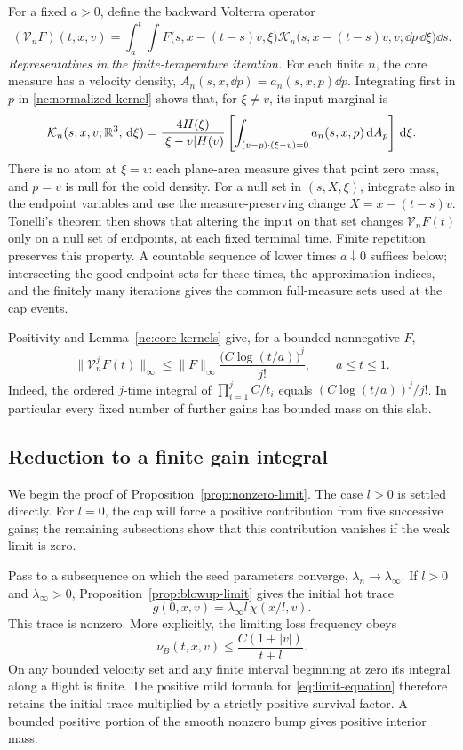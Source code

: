 For a fixed \(a>0\), define the backward Volterra operator
\begin{equation}
\label{nc:volterra}
 (\mathcal V_n F)(t,x,v)
 =
 \int_a^t\int
 F\bigl(s,x-(t-s)v,\xi\bigr)
 \mathcal K_n\bigl(s,x-(t-s)v,v;\dd p\,\dd\xi\bigr)\dd s .
\end{equation}
\emph{Representatives in the finite-temperature iteration.}
For each finite \(n\), the core measure has a velocity density,
\(A_n(s,x,\dd p)=a_n(s,x,p)\dd p\).
Integrating first in \(p\) in \eqref{nc:normalized-kernel} shows that,
for \(\xi\ne v\), its input marginal is
\[
\mathcal K_n(s,x,v;\mathbb R^3,\,\mathrm d\xi)
=\frac{4H(\xi)}{|\xi-v|H(v)}
  \left[\int_{(v-p)\cdot(\xi-v)=0}
       a_n(s,x,p)\,\mathrm d A_p\right]\,\mathrm d\xi.
\]
There is no atom at \(\xi=v\): each plane-area measure gives that
point zero mass, and \(p=v\) is null for the cold density.
For a null set in \((s,X,\xi)\), integrate also in the endpoint
variables and use the measure-preserving change
\(X=x-(t-s)v\). Tonelli's theorem then shows that altering the input
on that set changes \(\mathcal V_nF(t)\) only on a null set of
endpoints, at each fixed terminal time. Finite repetition preserves
this property. A countable sequence of lower times \(a\downarrow0\)
suffices below; intersecting the good endpoint sets for these times,
the approximation indices, and the finitely many iterations gives
the common full-measure sets used at the cap events.

Positivity and Lemma~\ref{nc:core-kernels} give, for a bounded
nonnegative \(F\),
\begin{equation}
\label{nc:iteration-norm}
 \|\mathcal V_n^jF(t)\|_\infty
 \le \|F\|_\infty\frac{\bigl(C\log(t/a)\bigr)^j}{j!},
 \qquad a\le t\le1.
\end{equation}
Indeed, the ordered \(j\)-time integral of
\(\prod_{i=1}^j C/t_i\) equals
\((C\log(t/a))^j/j!\).  In particular every fixed number of further
gains has bounded mass on this slab.

\subsection{Reduction to a finite gain integral}

We begin the proof of Proposition~\ref{prop:nonzero-limit}. The case
\(l>0\) is settled directly. For \(l=0\), the cap will force a
positive contribution from five successive gains; the remaining
subsections show that this contribution vanishes if the weak limit is zero.


Pass to a subsequence on which the seed parameters converge,
\(\lambda_n\to\lambda_\infty\).  If \(l>0\) and
\(\lambda_\infty>0\), Proposition~\ref{prop:blowup-limit}
gives the initial hot trace
\[
 g(0,x,v)=\lambda_\infty l\,\chi(x/l,v).
\]
This trace is nonzero.  More explicitly, the limiting loss
frequency obeys
\[
 \nu_B(t,x,v)\le
       \frac{C(1+|v|)}{t+l}.
\]
On any bounded velocity set and any finite interval beginning
at zero its integral along a flight is finite.  The positive
mild formula for \eqref{eq:limit-equation} therefore retains
the initial trace multiplied by a strictly positive survival
factor.  A bounded positive portion of the smooth nonzero bump
gives positive interior mass.

